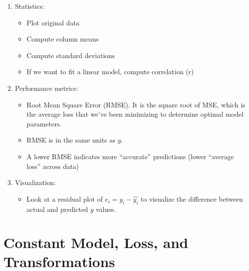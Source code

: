 \documentclass[
  letterpaper,
  DIV=11,
  numbers=noendperiod]{scrreprt}
\providecommand{\tightlist}{%
  \setlength{\itemsep}{0pt}\setlength{\parskip}{0pt}}\usepackage{longtable,booktabs,array}
\begin{document}
\begin{enumerate}
\def\labelenumi{\arabic{enumi}.}
\item
  Statistics:

  \begin{itemize}
  \tightlist
  \item
    Plot original data
  \item
    Compute column means
  \item
    Compute standard deviations
  \item
    If we want to fit a linear model, compute correlation (r)
  \end{itemize}
\item
  Performance metrics:

  \begin{itemize}
  \tightlist
  \item
    Root Mean Square Error (RMSE). It is the square root of MSE, which
    is the average loss that we've been minimizing to determine optimal
    model parameters.
  \item
    RMSE is in the same units as \(y\).
  \item
    A lower RMSE indicates more ``accurate'' predictions (lower
    ``average loss'' across data)
  \end{itemize}
\item
  Visualization:

  \begin{itemize}
  \tightlist
  \item
    Look at a residual plot of \(e_i = y_i - \hat{y_i}\) to visualize
    the difference between actual and predicted \(y\) values.
  \end{itemize}
\end{enumerate}


\hypertarget{constant-model-loss-and-transformations}{%
\chapter{Constant Model, Loss, and
Transformations}\label{constant-model-loss-and-transformations}}
\end{document}
